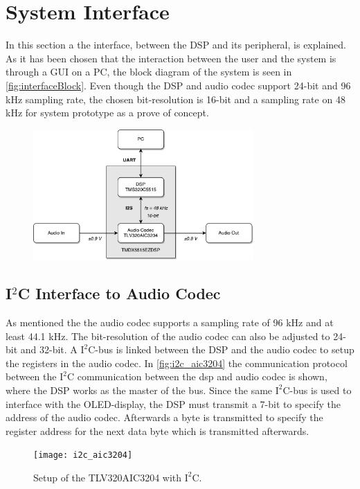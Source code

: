 \section{System Interface}

In this section a the interface, between the DSP and its peripheral, is explained. As it has been chosen that the interaction between the user and the system is through a GUI on a PC, the block diagram of the system is seen in \autoref{fig:interfaceBlock}. Even though the DSP and audio codec support 24-bit and 96 kHz sampling rate, the chosen bit-resolution is 16-bit and a sampling rate on 48 kHz for system prototype as a prove of concept.

\begin{figure}[H]
\centering
\includegraphics[width=0.75\textwidth]{figures/interfaceBlock.pdf}
\caption{}
\label{fig:interfaceBlock}
\end{figure}

\subsection*{I$^2$C Interface to Audio Codec}

As mentioned the the audio codec supports a sampling rate of 96 kHz and at least 44.1 kHz. The bit-resolution of the audio codec can also be adjusted to 24-bit and 32-bit. A $\text{I}^2$C-bus is linked between the DSP and the audio codec to setup the registers in the audio codec. In \autoref{fig:i2c_aic3204} the communication protocol between the $\text{I}^2$C communication between the dsp and audio codec is shown, where the DSP works as the master of the bus. Since the same $\text{I}^2$C-bus is used to interface with the OLED-display, the DSP must transmit a 7-bit to specify the address of the audio codec. Afterwards a byte is transmitted to specify the register address for the next data byte which is transmitted afterwards.

\begin{figure}[H]
\centering
\texttt{[image: i2c\_aic3204]}
\caption{Setup of the TLV320AIC3204 with $\text{I}^2$C.}
\label{fig:i2c_aic3204}
\end{figure}  

